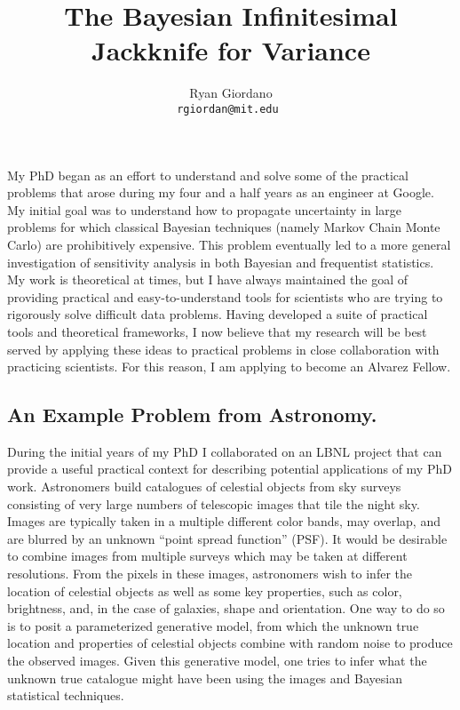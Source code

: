 

\title{The Bayesian Infinitesimal Jackknife for Variance}

\author{
  Ryan Giordano \\ \texttt{rgiordan@mit.edu }
}



My PhD began as an effort to understand and solve some of the practical problems
that arose during my four and a half years as an engineer at Google.  My initial
goal was to understand how to propagate uncertainty in large problems for which
classical Bayesian techniques (namely Markov Chain Monte Carlo) are
prohibitively expensive.  This problem eventually led to a more general
investigation of sensitivity analysis in both Bayesian and frequentist
statistics.  My work is theoretical at times, but I have always maintained the
goal of providing practical and easy-to-understand tools for scientists who are
trying to rigorously solve difficult data problems.  Having developed a suite of
practical tools and theoretical frameworks, I now believe that my research will
be best served by applying these ideas to practical problems in close
collaboration with practicing scientists.  For this reason, I am applying to
become an Alvarez Fellow.

\subsection*{An Example Problem from Astronomy.}

During the initial years of my PhD I collaborated on an LBNL project that can
provide a useful practical context for describing potential applications of my
PhD work.  Astronomers build catalogues of celestial objects from sky surveys
consisting of very large numbers of telescopic images that tile the night sky.
Images are typically taken in a multiple different color bands, may overlap, and
are blurred by an unknown ``point spread function'' (PSF). It would be desirable
to combine images from multiple surveys which may be taken at different
resolutions.  From the pixels in these images, astronomers wish to infer the
location of celestial objects as well as some key properties, such as color,
brightness, and, in the case of galaxies, shape and orientation.  One way to do
so is to posit a parameterized generative model, from which the unknown true
location and properties of celestial objects combine with random noise to
produce the observed images.  Given this generative model, one tries to infer
what the unknown true catalogue might have been using the images and Bayesian
statistical techniques.


